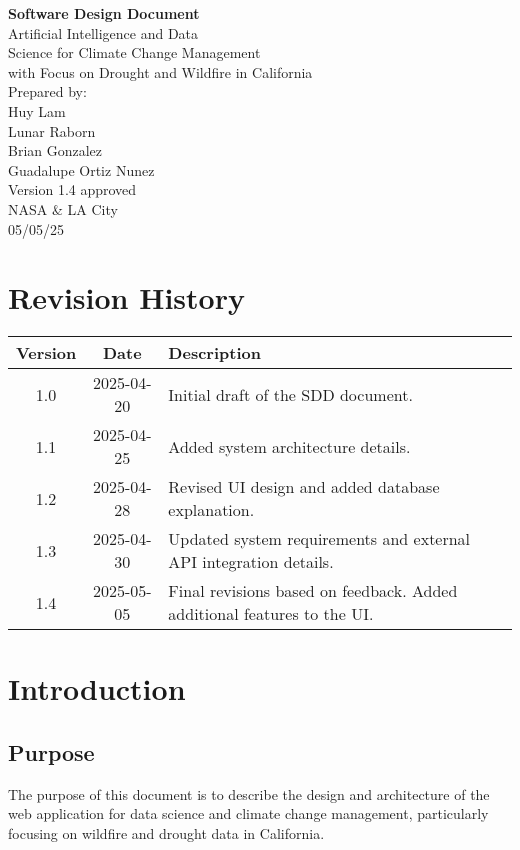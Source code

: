 \documentclass[12pt]{article}
\begin{document}
\begin{flushright}
\Huge \textbf{Software Design Document} \\[2em]
\color{blue}
\LARGE Artificial Intelligence and Data\\
Science for Climate Change Management\\
with Focus on Drought and Wildfire in California\\[2em]
\color{black}
\large Prepared by:\\
Huy Lam\\
Lunar Raborn\\
Brian Gonzalez\\
Guadalupe Ortiz Nunez\\[1em]
Version 1.4 approved\\
NASA \& LA City\\
05/05/25
\end{flushright}
\newpage

\tableofcontents
\newpage

\section*{Revision History}
\begin{longtable}{|c|c|p{3in}|}
\hline
\textbf{Version} & \textbf{Date} & \textbf{Description} \\
\hline
1.0 & 2025-04-20 & Initial draft of the SDD document. \\
\hline
1.1 & 2025-04-25 & Added system architecture details. \\
\hline
1.2 & 2025-04-28 & Revised UI design and added database explanation. \\
\hline
1.3 & 2025-04-30 & Updated system requirements and external API integration details. \\
\hline
1.4 & 2025-05-05 & Final revisions based on feedback. Added additional features to the UI. \\
\hline
\end{longtable}
\newpage

\section{Introduction}
\subsection{Purpose}
The purpose of this document is to describe the design and architecture of the web application for data science and climate change management, particularly focusing on wildfire and drought data in California.
\end{document}
